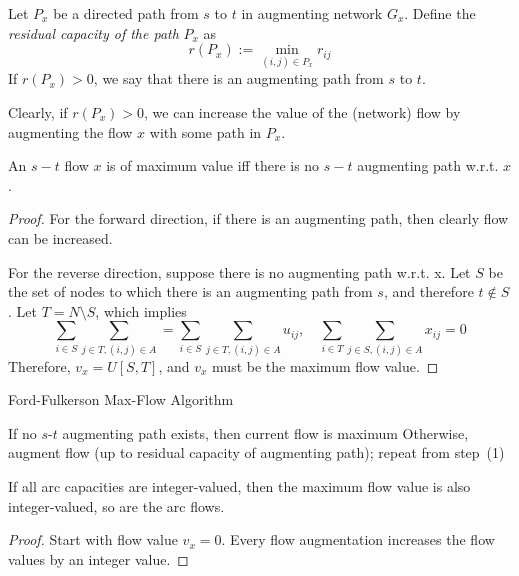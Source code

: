 \begin{definition}
Let $P_x$ be a directed path from $s$ to $t$ in augmenting network $G_x$.
Define the \emph{residual capacity of the path} $P_x$ as
\[
r(P_x):=\min_{(i,j)\in P_x}r_{ij}
\]
If $r(P_x)>0$, we say that there is an augmenting path from $s$ to $t$.
\end{definition}

Clearly, if $r(P_x)>0$, we can increase the value of the (network) flow by augmenting the flow $x$ with some path in $P_x$.

\begin{theorem}
An $s-t$ flow $x$ is of maximum value iff there is no $s-t$ augmenting path w.r.t. $x$.
\end{theorem}
\begin{proof}
For the forward direction, if there is an augmenting path, then clearly flow can be increased.

For the reverse direction, suppose there is no augmenting path w.r.t. x.
Let $S$ be the set of nodes to which there is an augmenting path from $s$, and therefore $t\notin S$.
Let $T=N\setminus S$, which implies
\[
\sum_{i\in S}\sum_{j\in T, (i,j)\in A}
=\sum_{i\in S}\sum_{j\in T, (i,j)\in A}u_{ij},\quad
\sum_{i\in T}\sum_{j\in S, (i,j)\in A}x_{ij}=0
\]
Therefore, $v_x=U[S,T]$, and $v_x$ must be the maximum flow value.
\end{proof}


\begin{algorithm}[htb] 
\caption{Ford-Fulkerson Max-Flow Algorithm} 
\label{alg:SM} 
\begin{algorithmic}[1] %
\STATE If no $s$-$t$ augmenting path exists, then current flow is maximum
\STATE
Otherwise, augment flow (up to residual capacity of augmenting
path); repeat from step~(1)
\end{algorithmic}
\end{algorithm}
\begin{corollary}
If all arc capacities are integer-valued, then the maximum flow value is also integer-valued, so are the arc flows.
\end{corollary}
\begin{proof}
Start with flow value $v_x=0$.
Every flow augmentation increases the flow values by an integer value.
\end{proof}


